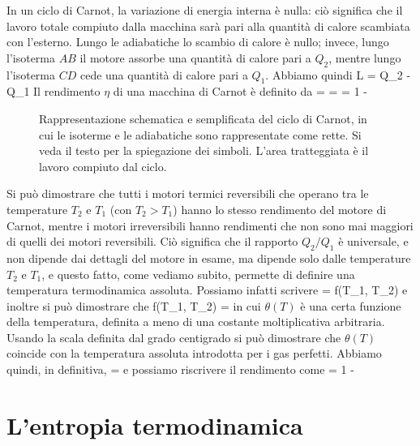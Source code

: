 In un ciclo di Carnot, la variazione di energia interna è nulla: ciò significa che il lavoro totale compiuto dalla macchina sarà pari alla quantità di calore scambiata con l'esterno. Lungo le adiabatiche lo scambio di calore è nullo; invece, lungo l'isoterma $AB$ il motore assorbe una quantità di calore pari a $Q_{2}$, mentre lungo l'isoterma $CD$ cede una quantità di calore pari a $Q_{1}$. Abbiamo quindi
%
\be
\label{eq:01-lavoro-carnot}
L = Q_{2} - Q_{1}
\ee
%
Il rendimento $\eta$ di una macchina di Carnot è definito da
%
\be
\label{eq:01-etaQ}
\eta =  =  = 1 - 
\ee
%
\begin{figure}[!ht]
  \centering
  
  \caption{Rappresentazione schematica e semplificata del ciclo di Carnot, in cui le isoterme e le adiabatiche sono rappresentate come rette. Si veda il testo per la spiegazione dei simboli. L'area tratteggiata è il lavoro compiuto dal ciclo.}
  \label{fig:01-carnot}
\end{figure}
Si può dimostrare che tutti i motori termici reversibili che operano tra le temperature $T_{2}$ e $T_{1}$ (con $T_{2}>T_{1}$) hanno lo stesso rendimento del motore di Carnot, mentre i motori irreversibili hanno rendimenti che non sono mai maggiori di quelli dei motori reversibili. Ciò significa che il rapporto $Q_{2}/Q_{1}$ è universale, e non dipende dai dettagli del motore in esame, ma dipende solo dalle temperature $T_{2}$ e $T_{1}$, e questo fatto, come vediamo subito, permette di definire una temperatura termodinamica assoluta. Possiamo infatti scrivere
\be
{} = f(T_{1}, T_{2})
\ee
e inoltre si può dimostrare che
\be
\label{eq:01-ft1t2}
f(T_{1}, T_{2}) = 
\ee
in cui $\theta(T)$ è una certa funzione della temperatura, definita a meno di una costante moltiplicativa arbitraria. Usando la scala definita dal grado centigrado si può dimostrare che $\theta(T)$ coincide con la temperatura assoluta introdotta per i gas perfetti. Abbiamo quindi, in definitiva,
\be
{} = 
\ee
e possiamo riscrivere il rendimento come
\be
\eta = 1 - 
\ee

\section{L'entropia termodinamica}
\label{sec:01-entropia}

